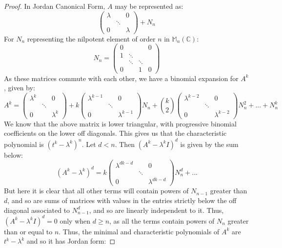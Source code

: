 \documentclass{article}
\newcommand{\bb}[1]{\mathbb{#1}}
\begin{document}
\begin{proof}
  In Jordan Canonical Form, $A$ may be represented as:
  \[
  \begin{pmatrix}
      \lambda &  & 0 \\
       & \ddots & \\
       0 &  & \lambda \end{pmatrix} + N_{n}
    \]
    For $N_{n}$ representing the nilpotent element of order $n$ in $\bb{M}_{n}(\bb{C})$:
     \[ N_{n} = 
        \begin{pmatrix}
      0 &  &  & 0 \\
        1 & \ddots & \\
         & \ddots & \ddots \\
     0 & & 1 & 0 \end{pmatrix}
     \]
    As these matrices commute with each other, we have a binomial expansion for $A^{k}$, given by:
    \[ A^{k} = 
       \begin{pmatrix}
      \lambda^{k} &  & 0 \\
       & \ddots & \\
       0 &  & \lambda^{k} \end{pmatrix} + k \begin{pmatrix}
      \lambda^{k-1} &  & 0 \\
       & \ddots & \\
       0 &  & \lambda^{k-1} \end{pmatrix} N_{n} +
     {k \choose 2} \begin{pmatrix}
      \lambda^{k-2} &  & 0 \\
       & \ddots & \\
       0 &  & \lambda^{k-2} \end{pmatrix} N_{n}^{2} + ... + N_{n}^{k} 
      \]
      We know that the above matrix is lower triangular, with progressive binomial coefficients on the lower off diagonals. This gives us that the characteristic polynomial is $(t^{k} - \lambda^{k})^{n}$. Let $d < n$. Then $(A^{k}-\lambda^{k}I)^{d}$ is given by the sum below:
      \[ (A^{k} - \lambda^{k})^{d} =
        k \begin{pmatrix}
      \lambda^{dk-d} &  & 0 \\
       & \ddots & \\
       0 &  & \lambda^{dk-d} \end{pmatrix} N_{n}^{d} + ... 
      \]
      But here it is clear that all other terms will contain powers of $N_{n-1}$ greater than $d$, and so are sums of matrices with values in the entries strictly below the off diagonal associated to $N_{n-1}^{d}$, and so are linearly independent to it. Thus, $(A^{k} - \lambda^{k}I)^{d} = 0$ only when $d \geq n$, as all the terms contain powers of $N_{n}$ greater than or equal to $n$. Thus, the minimal and characteristic polynomials of $A^{k}$ are $t^{k} - \lambda^{k}$ and so it has Jordan form:

\end{proof}
\end{document}
